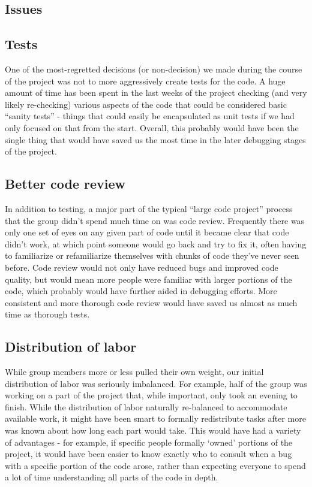 \documentclass[12pt]{article}
\begin{document}
\subsection{Issues}

\subsection*{Tests}

One of the most-regretted decisions (or non-decision) we made during the course of the project was not to more aggressively create tests for the code. A huge amount of time has been spent in the last weeks of the project checking (and very likely re-checking) various aspects of the code that could be considered basic “sanity tests” - things that could easily be encapsulated as unit tests if we had only focused on that from the start. Overall, this probably would have been the single thing that would have saved us the most time in the later debugging stages of the project.

\subsection*{Better code review}

In addition to testing, a major part of the typical “large code project” process that the group didn’t spend much time on was code review. Frequently there was only one set of eyes on any given part of code until it became clear that code didn’t work, at which point someone would go back and try to fix it, often having to familiarize or refamiliarize themselves with chunks of code they’ve never seen before. Code review would not only have reduced bugs and improved code quality, but would mean more people were familiar with larger portions of the code, which probably would have further aided in debugging efforts. More consistent and more thorough code review would have saved us almost as much time as thorough tests.

\subsection*{Distribution of labor}

While group members more or less pulled their own weight, our initial distribution of labor was seriously imbalanced. For example, half of the group was working on a part of the project that, while important, only took an evening to finish. While the distribution of labor naturally re-balanced to accommodate available work, it might have been smart to formally redistribute tasks after more was known about how long each part would take. This would have had a variety of advantages - for example, if specific people formally ‘owned’ portions of the project, it would have been easier to know exactly who to consult when a bug with a specific portion of the code arose, rather than expecting everyone to spend a lot of time understanding all parts of the code in depth.
\end{document}
